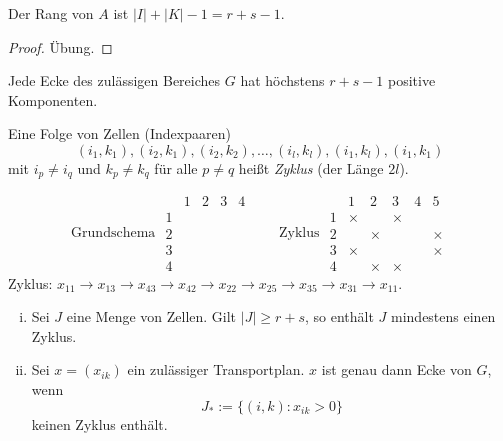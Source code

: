 \begin{aus} %
  Der Rang von $A$ ist $|I| + |K| - 1 = r + s - 1$.
\end{aus}

\begin{proof}
  Übung.
\end{proof}

\begin{flg}
  Jede Ecke des zulässigen Bereiches $G$ hat höchstens $r+s-1$ positive
  Komponenten.
\end{flg}

\begin{defn} %
  Eine Folge von Zellen (Indexpaaren)
  \[ (i_1, k_1), (i_2, k_1), (i_2, k_2), \ldots,
    (i_l, k_l), (i_1, k_l), (i_1, k_1) \]
  mit $i_p \ne i_q$ und $k_p \ne k_q$ für alle $p \ne q$ heißt \emph{Zyklus}
  (der Länge $2l$).
\end{defn}

\begin{exmp} %
  \[ \text{Grundschema }
    \begin{array}{c|cccc}
      & 1 & 2 & 3 & 4 \\
      \hline
      1 \\ 2 \\ 3 \\ 4
    \end{array}
    \qquad \text{Zyklus }
    \begin{array}{c|ccccc}
      & 1 & 2 & 3 & 4 & 5 \\
      \hline
      1 & \times & & \times \\
      2 & & \times & & & \times \\
      3 & \times & & & & \times \\
      4 & & \times & \times
    \end{array}
  \]
  Zyklus: $x_{11} \to x_{13} \to x_{43} \to x_{42} \to x_{22} \to x_{25} \to
  x_{35} \to x_{31} \to x_{11}$.
\end{exmp}

\begin{aus}
  \begin{enumerate}[(i)]
  \item Sei $J$ eine Menge von Zellen. Gilt $|J| \ge r + s$, so enthält $J$
    mindestens einen Zyklus.
  \item Sei $x = (x_{ik})$ ein zulässiger Transportplan. $x$ ist genau dann Ecke
    von $G$, wenn
    \[ J_* := \{ (i,k) : x_{ik} > 0 \} \]
    keinen Zyklus enthält.
  \end{enumerate}
\end{aus}

